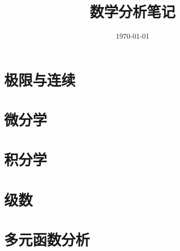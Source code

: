 \documentclass[UTF8,12pt,a4paper,fontset=fandol]{ctexbook}
\title{数学分析笔记}
\author{}
\date{\today}
\begin{document}
\maketitle
\tableofcontents
\clearpage


\chapter{极限与连续}


\chapter{微分学}


\chapter{积分学}


\chapter{级数}


\chapter{多元函数分析}
\end{document}
